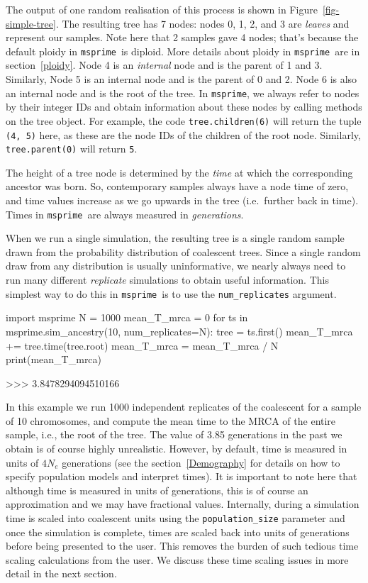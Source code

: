 \documentclass[graybox]{svmult}
\newcommand{\msprime}[0]{\texttt{msprime}}
\begin{document}
The output of one random realisation of this process is shown in
Figure~\ref{fig-simple-tree}. The resulting tree has 7 nodes:
nodes 0, 1, 2, and 3 are \emph{leaves} and
represent our samples. Note here that 2 samples gave 4 nodes;
that's because the default ploidy in \msprime\ is diploid.
More details about ploidy in \msprime\ are in section~\ref{ploidy}.
Node 4 is an \emph{internal} node and is the
parent of 1 and 3. Similarly, Node 5 is an internal node and is the
parent of 0 and 2. Node 6 is also an internal node and is the root of
the tree. In \msprime, we always refer to nodes by their integer IDs and
obtain information about these nodes by calling methods on the tree
object. For example, the code \texttt{tree.children(6)} will return the
tuple \texttt{(4,\ 5)} here, as these are the node IDs of the children
of the root node. Similarly, \texttt{tree.parent(0)} will return
\texttt{5}.

The height of a tree node is determined by the \emph{time} at which the corresponding
ancestor was born. So,
contemporary samples always have a node time of zero, and time values
increase as we go upwards in the tree (i.e.\ further back in time). Times
in \msprime\ are always measured in \emph{generations}.

When we run a single simulation, the resulting tree is a single random
sample drawn from the probability distribution of coalescent trees. Since a
single random draw from any distribution is usually uninformative, we
nearly always need to run many different \emph{replicate} simulations to
obtain useful information. This simplest way to do this in \msprime\ is to
use the \texttt{num\_replicates} argument.

\begin{pythoncode}
import msprime
N = 1000
mean_T_mrca = 0
for ts in msprime.sim_ancestry(10, num_replicates=N):
    tree = ts.first()
    mean_T_mrca += tree.time(tree.root)
mean_T_mrca = mean_T_mrca / N
print(mean_T_mrca)

>>> 3.8478294094510166
\end{pythoncode}

    In this example we run 1000 independent replicates of the coalescent for
a sample of 10 chromosomes, and compute the mean time to the MRCA of the entire sample, i.e., the root of the
tree. The value of 3.85 generations in the past we obtain is of course highly unrealistic.
However, by default, time is measured in units of \(4 N_e\) generations (see the section~\ref{Demography}
for details on how to specify population models and interpret times). It is important to note here
that although time is measured in units of generations, this is of course
an approximation and we may have fractional values. Internally,
during a simulation time is scaled into coalescent units
using the \texttt{population\_size} parameter and once the
simulation is complete, times are scaled back into units of generations
before being presented to the user. This removes the burden of such
tedious time scaling calculations from the user. We discuss these time
scaling issues in more detail in the next section.
\end{document}
